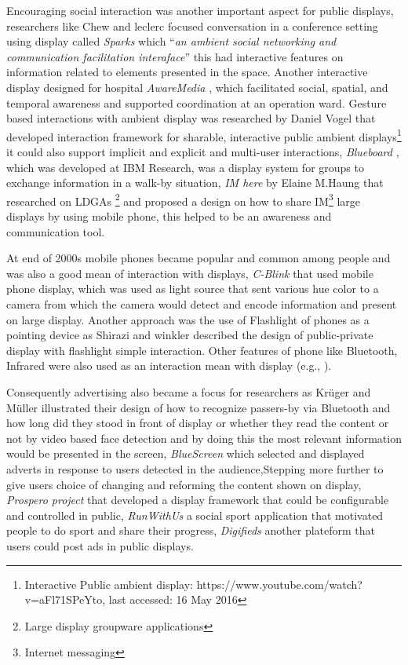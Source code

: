 Encouraging social interaction was another important aspect for public displays, researchers like Chew and leclerc \cite{chew_interaction} focused conversation in a conference setting using display called \emph{Sparks} which ``\emph{an ambient social networking and communication facilitation interaface}'' this had interactive features on information related to elements presented in the space. Another interactive display designed for hospital \emph{AwareMedia} \cite{ interactive_hospital}, which facilitated  social, spatial, and temporal awareness and supported coordination at an operation ward. Gesture based interactions with ambient display was researched by Daniel Vogel \cite{vogel} that developed interaction framework for sharable, interactive public ambient displays\footnote{Interactive Public ambient display:  https://www.youtube.com/watch?v=aFl71SPeYto, last accessed: 16 May 2016} it could also support implicit and explicit and multi-user interactions, \emph{Blueboard} \cite{blueboard} , which was developed at IBM Research, was a display system for groups to exchange information in a walk-by situation, \emph{IM here} \cite{ imahere} by Elaine M.Haung that researched on LDGAs \footnote{Large display groupware applications} and proposed a design on how to share IM\footnote{Internet messaging} large displays by using mobile phone, this helped to be an awareness and communication tool.

At end of 2000s mobile phones became popular and common among people and was also a good mean of interaction with displays, \emph{C-Blink} \cite{cblink} that used mobile phone display, which was used as light source that sent various hue color to a camera from which the camera would detect and encode information and present on large display. Another approach was the use of Flashlight of phones as a pointing device as Shirazi and winkler \cite{flashlight} described the design of public-private display with flashlight simple interaction. Other features of phone like Bluetooth, Infrared were also used as an interaction mean with display (e.g., \cite{bluetooth2, Bluetooth}).

Consequently advertising also became a focus for researchers as Krüger and Müller illustrated their design of how to recognize passers-by via Bluetooth \cite{toward_situated} and how long did they stood in front of display or whether they read the content or not by video based face detection and by doing this the most relevant information would be presented in the screen, \emph{BlueScreen} \cite{bluescreen} which selected and displayed adverts in response to users detected in the audience,Stepping more further to give users choice of changing and reforming the content shown on display, \emph{Prospero project} \cite{prospero} that developed a display framework that could be configurable and controlled in public, \emph{RunWithUs} \cite{runwithuse} a social sport application that motivated people to do sport and share their progress, \emph{Digifieds} \cite{digifieds} another plateform that users could post ads in public displays.

